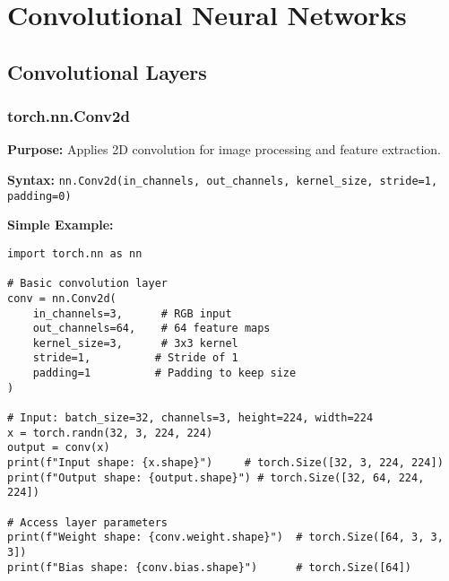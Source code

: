 \documentclass[11pt,a4paper]{book}
\begin{document}
\chapter{Convolutional Neural Networks}

\section{Convolutional Layers}

\subsection{torch.nn.Conv2d}

\textbf{Purpose:} Applies 2D convolution for image processing and feature extraction.

\textbf{Syntax:} \texttt{nn.Conv2d(in\_channels, out\_channels, kernel\_size, stride=1, padding=0)}

\textbf{Simple Example:}
\begin{verbatim}
import torch.nn as nn

# Basic convolution layer
conv = nn.Conv2d(
    in_channels=3,      # RGB input
    out_channels=64,    # 64 feature maps
    kernel_size=3,      # 3x3 kernel
    stride=1,          # Stride of 1
    padding=1          # Padding to keep size
)

# Input: batch_size=32, channels=3, height=224, width=224
x = torch.randn(32, 3, 224, 224)
output = conv(x)
print(f"Input shape: {x.shape}")     # torch.Size([32, 3, 224, 224])
print(f"Output shape: {output.shape}") # torch.Size([32, 64, 224, 224])

# Access layer parameters
print(f"Weight shape: {conv.weight.shape}")  # torch.Size([64, 3, 3, 3])
print(f"Bias shape: {conv.bias.shape}")      # torch.Size([64])
\end{verbatim}
\end{document}
